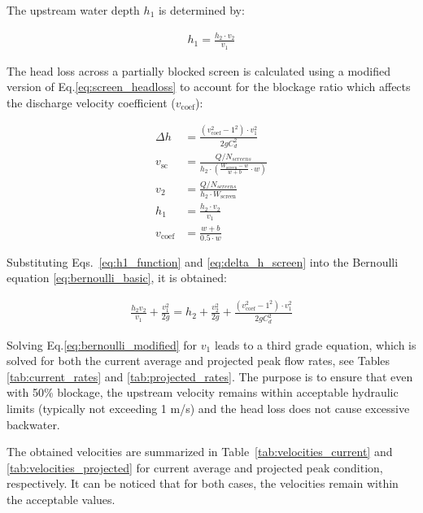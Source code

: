\documentclass[11pt]{article}
\begin{document}
The upstream water depth \( h_1 \) is determined by:

\begin{align}
h_1 = \frac{h_2 \cdot v_2}{v_1}
\label{eq:h1_function}
\end{align}

The head loss across a partially blocked screen is calculated using 
a modified version of Eq.\eqref{eq:screen_headloss} to account 
for the blockage ratio which affects the discharge velocity coefficient ($v_\text{coef}$):

\begin{align}
\Delta h &= \frac{(v_{\text{coef}}^2 - 1^2) \cdot v_1^2}{2g C_d^2} \label{eq:delta_h_screen}\\
v_{\text{sc}} &= \frac{Q / N_{screens}}{h_2 \cdot \left( \frac{W_{\text{screen}} - w}{w + b} \cdot w \right)}\\
v_2 &= \frac{Q / N_{screens}}{h_2 \cdot W_{\text{screen}}}\\
h_1 &= \frac{h_2 \cdot v_2}{v_1}\\
v_{\text{coef}} &= \frac{w + b}{0.5 \cdot w}
\end{align}

Substituting Eqs.~\eqref{eq:h1_function} and \eqref{eq:delta_h_screen} into the 
Bernoulli equation \eqref{eq:bernoulli_basic}, it is obtained:

\begin{align}
\frac{h_2 v_2}{v_1} + \frac{v_1^2}{2g} = h_2 + \frac{v_2^2}{2g} + \frac{(v_{\text{coef}}^2 - 1^2) \cdot v_1^2}{2g C_d^2}
\label{eq:bernoulli_modified}
\end{align}

Solving Eq.\eqref{eq:bernoulli_modified} for $v_1$ leads to a third grade 
equation, which is solved for both the current average and projected peak 
flow rates, see Tables \ref{tab:current_rates} and \ref{tab:projected_rates}. 
The purpose is to ensure that 
even with 50\% blockage, the upstream velocity remains within acceptable 
hydraulic limits (typically not exceeding 1 m/s) and the head loss does 
not cause excessive backwater.

The obtained velocities are summarized in  
Table~\ref{tab:velocities_current} and \ref{tab:velocities_projected} 
for current average and projected peak condition, respectively. 
It can be noticed that for both cases, the velocities remain within the 
acceptable values. 
\end{document}

